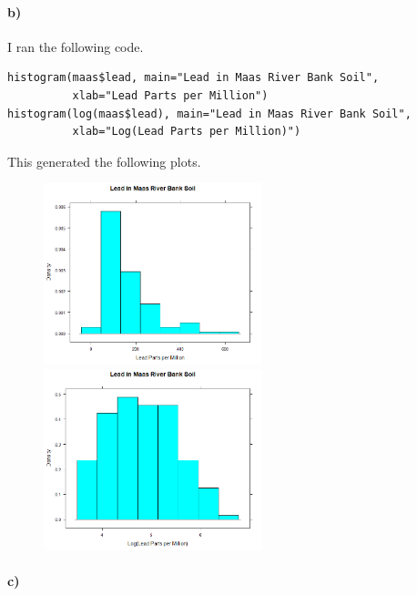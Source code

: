 \documentclass[12pt]{article}
\begin{document}
\paragraph{b)}

I ran the following code.
\begin{verbatim}
histogram(maas$lead, main="Lead in Maas River Bank Soil",
          xlab="Lead Parts per Million")
histogram(log(maas$lead), main="Lead in Maas River Bank Soil",
          xlab="Log(Lead Parts per Million)")
\end{verbatim}
This generated the following plots.
\begin{figure}[H]
    \begin{center}
        \includegraphics[width=2.5in]{exercise3b-normal.png}
        \includegraphics[width=2.5in]{exercise3b-log.png}
    \end{center}
\end{figure}

\paragraph{c)}
\end{document}
